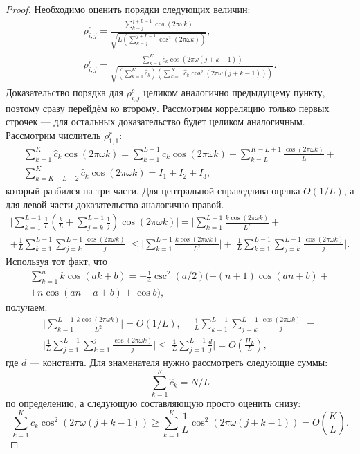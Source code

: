 \documentclass[12pt,a4paper,fleqn,leqno]{article}
\begin{document}
\begin{proof}
Необходимо оценить порядки следующих величин:
\begin{gather*}
\rho^c_{i,j} = \frac{\sum_{k=j}^{j + L - 1} \cos(2 \pi \omega k)}{\sqrt{L (\sum_{k=j}^{j + L - 1} \cos^2(2 \pi \omega k))}}, \\ \rho^r_{i,j} = \frac{\sum_{k=1}^K \hat c_k\cos(2 \pi \omega (j + k - 1))}{\sqrt{(\sum_{k=1}^K \hat c_k) (\sum_{k=1}^K \hat c_k\cos^2(2 \pi \omega (j + k - 1)))}}.
\end{gather*}
Доказательство порядка для $\rho^c_{i,j}$ целиком аналогично предыдущему пункту, поэтому сразу перейдём ко второму. Рассмотрим корреляцию только первых строчек --- для остальных доказательство будет целиком аналогичным. Рассмотрим числитель $\rho^r_{1,1}$:
\begin{gather*}
\sum_{k=1}^K \hat c_k\cos(2 \pi \omega k) = \sum_{k=1}^{L-1} \hat c_k\cos(2 \pi \omega k) + \sum_{k=L}^{K - L + 1} \frac{\cos(2 \pi \omega k)}{L} +\\ \sum_{k=K - L + 2}^{K} \hat c_k\cos(2 \pi \omega k) = I_1 + I_2 + I_3,
\end{gather*}
который разбился на три части. Для центральной справедлива оценка $O(1/L)$, а для левой части доказательство аналогично правой.
\begin{gather*}
\bigg|\sum_{k=1}^{L-1}\frac{1}{L}\left(\frac{k}{L} + \sum_{j=k}^{L-1} \frac{1}{j} \right) \cos(2 \pi \omega k)\bigg| = \bigg|\sum_{k=1}^{L-1} \frac{k \cos(2 \pi \omega k)}{L^2} + \\ + \frac{1}{L}\sum_{k = 1}^{L-1}\sum_{j = k}^{L-1}\frac{\cos(2 \pi \omega k)}{j}\bigg| \le
\bigg|\sum_{k=1}^{L-1} \frac{k \cos(2 \pi \omega k)}{L^2}\bigg| + \bigg|\frac{1}{L}\sum_{k = 1}^{L-1}\sum_{j = k}^{L-1}\frac{\cos(2 \pi \omega k)}{j}\bigg|.
\end{gather*}
Используя тот факт, что
\begin{gather*}
\sum_{k=1}^n k \cos(ak + b) = -\frac{1}{4}\csc^2(a/2)(-(n+1)\cos(an+b) + \\ + n\cos(an + a + b) + \cos b),
\end{gather*}
получаем:
\begin{gather*}
\bigg|\sum_{k=1}^{L-1} \frac{k \cos(2 \pi \omega k)}{L^2}\bigg| = O(1/L), \quad
\bigg|\frac{1}{L}\sum_{k = 1}^{L-1}\sum_{j = k}^{L-1}\frac{\cos(2 \pi \omega k)}{j}\bigg| = \\ \bigg|\frac{1}{L}\sum_{j = 1}^{L-1}\sum_{k = 1}^{j}\frac{\cos(2 \pi \omega k)}{j}\bigg| \le \bigg|\frac{1}{L}\sum_{j = 1}^{L-1}\frac{d}{j}\bigg| = O \left(\frac{H_L}{L} \right),
\end{gather*}
где $d$ --- константа. Для знаменателя нужно рассмотреть следующие суммы:
\begin{equation*}
\sum_{k=1}^K \hat c_k = N / L
\end{equation*}
по определению, а следующую составляющую просто оценить снизу:
\begin{equation*}
\sum_{k=1}^K \hat c_k\cos^2(2 \pi \omega (j + k - 1)) \ge \sum_{k=1}^K \frac{1}{L}\cos^2(2 \pi \omega (j + k - 1)) = O \left(\frac{K}{L} \right).
\end{equation*}
\end{proof}
 
\end{document}
